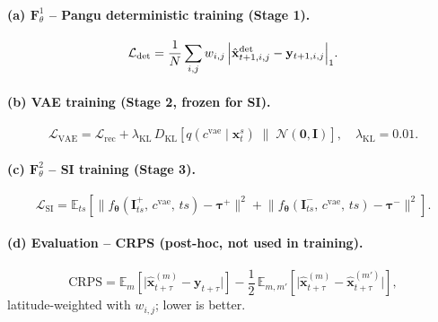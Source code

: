 \documentclass[11pt]{article}
\begin{document}
\paragraph{(a) $\mathbf{F}^1_\theta$ -- Pangu deterministic training (Stage 1).}
\begin{equation}
  \mathcal{L}_{\mathrm{det}}
  = \frac{1}{N}\sum_{i,j} w_{i,j}\,
    \Bigl|\hat{\mathbf{x}}_{t+1,i,j}^{\mathrm{det}} - \mathbf{y}_{t+1,i,j}\Bigr|_1.
\end{equation}

\paragraph{(b) VAE training (Stage 2, frozen for SI).}
\begin{equation}
  \mathcal{L}_{\mathrm{VAE}}
  = \mathcal{L}_{\mathrm{rec}}
  + \lambda_{\mathrm{KL}}\,
    D_{\mathrm{KL}}\!\left[
      q\!\left(c^{\mathrm{vae}}\mid\mathbf{x}_t^s\right)
      \;\|\;\mathcal{N}(\mathbf{0},\mathbf{I})
    \right],
  \quad \lambda_{\mathrm{KL}} = 0.01.
\end{equation}

\paragraph{(c) $\mathbf{F}^2_\theta$ -- SI training (Stage 3).}
\begin{equation}
  \mathcal{L}_{\mathrm{SI}}
  = \mathbb{E}_{ts}\!\left[
      \bigl\|f_{\bm{\theta}}(\mathbf{I}_{ts}^+,\,c^{\mathrm{vae}},\,ts)
             - \bm{\tau}^+\bigr\|^2
    + \bigl\|f_{\bm{\theta}}(\mathbf{I}_{ts}^-,\,c^{\mathrm{vae}},\,ts)
             - \bm{\tau}^-\bigr\|^2
    \right].
\end{equation}

\paragraph{(d) Evaluation -- CRPS (post-hoc, not used in training).}
\begin{equation}
  \mathrm{CRPS}
  = \mathbb{E}_{m}\!\left[
      \bigl|\hat{\mathbf{x}}_{t+\tau}^{(m)} - \mathbf{y}_{t+\tau}\bigr|
    \right]
  - \frac{1}{2}\,\mathbb{E}_{m,m'}\!\left[
      \bigl|\hat{\mathbf{x}}_{t+\tau}^{(m)} - \hat{\mathbf{x}}_{t+\tau}^{(m')}\bigr|
    \right],
\end{equation}
latitude-weighted with $w_{i,j}$; lower is better.

\end{document}
